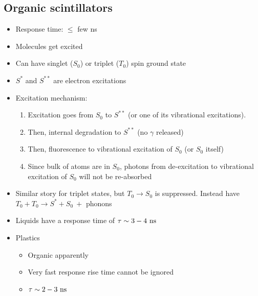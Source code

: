 \subsection{Organic scintillators}
\begin{itemize}
  \item Response time: $\leq$ few ns
  \item Molecules get excited
  \item Can have singlet ($S_0$) or triplet ($T_0$) spin ground state
  \item $S^*$ and $S^{**}$ are electron excitations
  \item Excitation mechanism:
  \begin{enumerate}
    \item Excitation goes from $S_0$ to $S^{**}$ (or one of its vibrational excitations).
    \item Then, internal degradation to $S^{**}$ (no $\gamma$ released)
    \item Then, fluorescence  to vibrational excitation of $S_0$ (or $S_0$ itself)
    \item Since bulk of atoms are in $S_0$, photons from de-excitation to vibrational excitation of $S_0$ will not be re-absorbed
  \end{enumerate}
  \item Similar story for triplet states, but $T_0\rightarrow S_0$ is suppressed. Instead have $T_0+T_0 \rightarrow S^*+S_0~+$ phonons
  \item Liquids have a response time of $\tau\sim 3-4~\text{ns}$
  \item Plastics 
  \begin{itemize}
    \item Organic apparently
    \item Very fast response \thus rise time cannot be ignored
    \item $\tau\sim 2-3~\text{ns}$
  \end{itemize}
\end{itemize}

